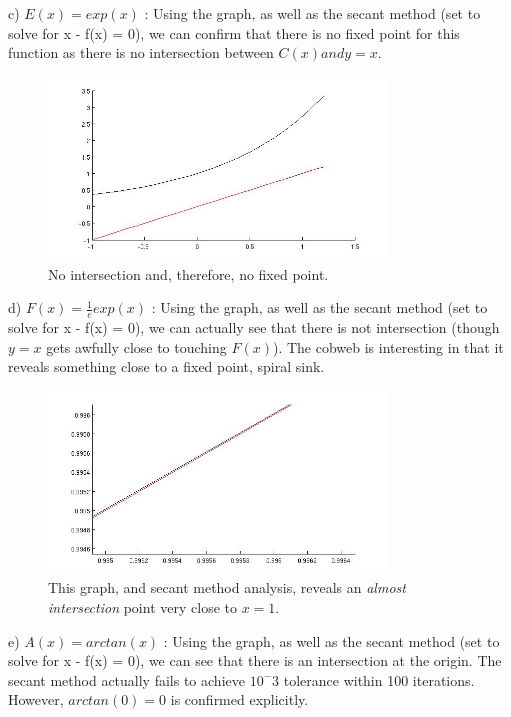 \documentclass[12pt]{article}
\newenvironment{myenv}{\begin{adjustwidth}{1cm}{}}{\end{adjustwidth}}
\begin{document}
\begin{myenv}
c) $E(x) = exp(x)$ : Using the graph, as well as the secant method (set to solve for x - f(x) = 0), we can confirm that there is no fixed point for this function as there is no intersection between $C(x) and y = x$.

\begin{figure} [H]
    \centering
    \includegraphics[width=0.8\textwidth]{secant2c}
    \caption{No intersection and, therefore, no fixed point.}
    \label{figure:a4}
\end{figure}

d) $F(x) = \frac{1}{e}exp(x)$ : Using the graph, as well as the secant method (set to solve for x - f(x) = 0), we can actually see that there is not intersection (though $y=x$ gets awfully close to touching $F(x)$). The cobweb is interesting in that it reveals something close to a fixed point, spiral sink.

\begin{figure} [H]
    \centering
    \includegraphics[width=0.8\textwidth]{secant2d}
    \caption{This graph, and secant method analysis, reveals an \emph{almost intersection} point very close to $x=1$. }
    \label{figure:a4}
\end{figure}

e) $A(x) = arctan(x)$ : Using the graph, as well as the secant method (set to solve for x - f(x) = 0), we can see that there is an intersection at the origin. The secant method actually fails to achieve $10^-3$ tolerance within 100 iterations. However, $arctan(0) = 0$ is confirmed explicitly.


\end{myenv}
\end{document}
